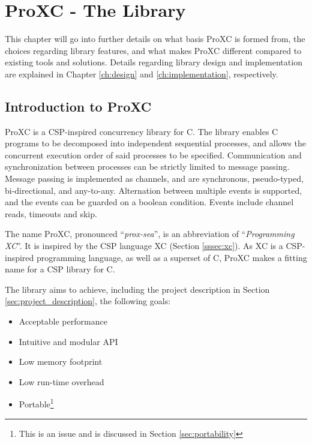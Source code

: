 
\chapter{ProXC - The Library}
\label{ch:proxc_library}

This chapter will go into further details on what basis ProXC is formed from, the choices regarding library features, and what makes ProXC different compared to existing tools and solutions. Details regarding library design and implementation are explained in Chapter \ref{ch:design} and \ref{ch:implementation}, respectively. 


\section{Introduction to ProXC}
\label{sec:proxc_intro}

ProXC is a CSP\hyp{}inspired concurrency library for C. The library enables C programs to be decomposed into independent sequential processes, and allows the concurrent execution order of said processes to be specified. Communication and synchronization between processes can be strictly lim\-ited to message passing. Message passing is implemented as channels, and are synch\-ronous, pseudo\hyp{}typed, bi\hyp{}directional, and any\hyp{}to\hyp{}any. Alternation between multiple ev\-ents is supp\-orted, and the events can be guarded on a boolean condition. Events include channel reads, timeouts and skip. 

The name ProXC, pronounced ``\textit{prox\hyp{}sea}'', is an abbreviation of ``\textit{Programming XC}''. It is inspired by the CSP language XC (Section \ref{sssec:xc}). As XC is a CSP\hyp{}inspired programming language, as well as a superset of C, ProXC makes a fitting name for a CSP library for C. 

The library aims to achieve, including the project description in Section \ref{sec:project_description}, the following goals:
\begin{itemize}
    \setlength\itemsep{0em}
    \item Acceptable performance
    \item Intuitive and modular API
    \item Low memory footprint
    \item Low run\hyp{}time overhead
    \item Portable\footnote{This is an issue and is discussed in Section \ref{sec:portability}}
\end{itemize}

